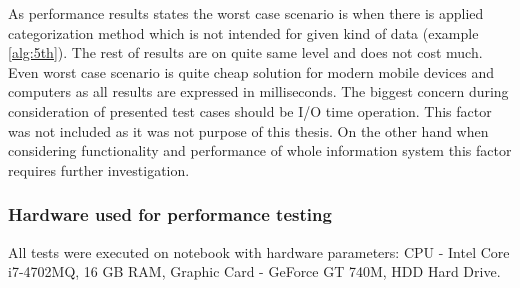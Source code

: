As performance results states the worst case scenario is when there is applied categorization method which is not intended for given kind of data (example \ref{alg:5th}). The rest of results are on quite same level and does not cost much. Even worst case scenario is quite cheap solution for modern mobile devices and computers as all results are expressed in milliseconds. The biggest concern during consideration of presented test cases should be I/O time operation. This factor was not included as it was not purpose of this thesis. On the other hand when considering functionality and performance of whole information system this factor requires further investigation.

\subsubsection{Hardware used for performance testing}
All tests were executed on notebook with hardware parameters: CPU - Intel Core i7-4702MQ, 16 GB RAM, Graphic Card - GeForce GT 740M, HDD Hard Drive.
    
